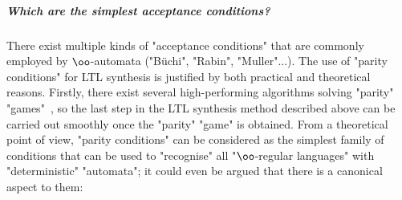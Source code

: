 \documentclass[10pt,a4paper]{amsart}
\newcommand{\NP}{\ensuremath{\mathsf{NP}}}
\newcommand{\PSPACE}{\ensuremath{\mathsf{PSPACE}}}
\begin{document}
\subparagraph{Which are the simplest acceptance conditions?}
There exist multiple kinds of "acceptance conditions" that are commonly employed by $\oo$-automata ("B\"uchi", "Rabin", "Muller"...). The use of "parity conditions" for LTL synthesis is justified by both practical and theoretical reasons. Firstly, there exist several high-performing algorithms solving "parity" "games"~\cite{DiStasio2021ParityGames,FriedmannM09ParityGames,SyntCompReport22,LvD20SymbolicParity,Dijk18Oink}, so the last step in the LTL synthesis method described above can be carried out smoothly once the "parity" "game" is obtained. 
From a theoretical point of view, "parity conditions" can be considered as the simplest family of conditions that can be used to "recognise" all "$\oo$-regular languages" with "deterministic" "automata"; it could even be argued that there is a canonical aspect to them:
\end{document}
